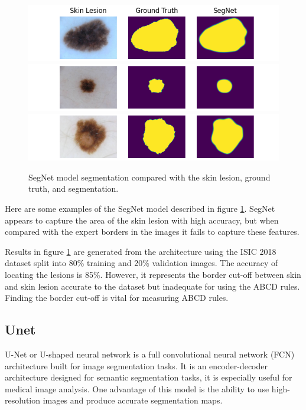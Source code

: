 \begin{figure}[]
    \centering
    \includegraphics[scale=0.7]{images/segmentation/SegNet-1.png}
    \includegraphics[scale=0.7]{images/segmentation/SegNet-2.png}
    \includegraphics[scale=0.7]{images/segmentation/SegNet-3.png}
    \caption{SegNet model segmentation compared with the skin lesion, ground truth, and segmentation.}\label{SegNet-examples}
\end{figure}

Here are some examples of the SegNet model described in figure \ref{SegNet-examples}. SegNet appears to capture the area of the skin lesion with high accuracy, but when compared with the expert borders in the images it fails to capture these features.

Results in figure \ref{SegNet-examples} are generated from the architecture using the ISIC 2018 dataset split into 80\% training and 20\% validation images. The accuracy of locating the lesions is 85\%. However, it represents the border cut-off between skin and skin lesion accurate to the dataset but inadequate for using the ABCD rules. Finding the border cut-off is vital for measuring ABCD rules\cite{Pereira2020}.

\subsection{Unet}
U-Net or U-shaped neural network is a full convolutional neural network (FCN) architecture built for image segmentation tasks. It is an encoder-decoder architecture designed for semantic segmentation tasks, it is especially useful for medical image analysis. One advantage of this model is the ability to use high-resolution images and produce accurate segmentation maps.

